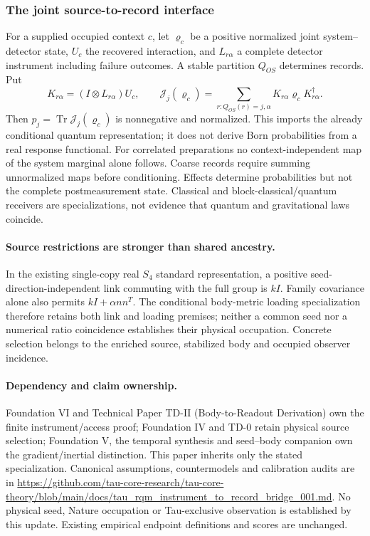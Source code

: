 \documentclass[11pt]{article}
\begin{document}
\subsubsection{The joint source-to-record interface}
For a supplied occupied context $c$, let $\varrho_c$ be a positive normalized
joint system--detector state, $U_c$ the recovered interaction, and
$L_{r\alpha}$ a complete detector instrument including failure outcomes.
A stable partition $Q_{OS}$ determines records. Put
\[
 K_{r\alpha}=(I\otimes L_{r\alpha})U_c,\qquad
 \mathcal J_j(\varrho_c)=
 \sum_{r:Q_{OS}(r)=j,\alpha}K_{r\alpha}\varrho_c K_{r\alpha}^\dagger.
\]
Then $p_j=\operatorname{Tr}\mathcal J_j(\varrho_c)$ is nonnegative and
normalized. This imports the already conditional quantum representation;
it does not derive Born probabilities from a real response functional.
For correlated preparations no context-independent map of the system
marginal alone follows. Coarse records require summing unnormalized maps
before conditioning. Effects determine probabilities but not the complete
postmeasurement state. Classical and block-classical/quantum receivers are
specializations, not evidence that quantum and gravitational laws coincide.

\paragraph{Source restrictions are stronger than shared ancestry.}
In the existing single-copy real $S_4$ standard representation, a positive
seed-direction-independent link commuting with the full group is $kI$.
Family covariance alone also permits $kI+\alpha nn^T$. The conditional
body-metric loading specialization therefore retains both link and loading
premises; neither a common seed nor a numerical ratio coincidence establishes
their physical occupation. Concrete selection belongs to the enriched source,
stabilized body and occupied observer incidence.

\paragraph{Dependency and claim ownership.}
Foundation VI and Technical Paper TD-II (Body-to-Readout Derivation) own the finite instrument/access proof; Foundation IV and TD-0 retain physical source selection; Foundation V, the temporal synthesis and seed--body companion own the gradient/inertial distinction. This paper inherits only the stated specialization. Canonical assumptions, countermodels and calibration audits are in \url{https://github.com/tau-core-research/tau-core-theory/blob/main/docs/tau_rqm_instrument_to_record_bridge_001.md}. No physical seed, Nature occupation or Tau-exclusive observation is established by this update. Existing empirical endpoint definitions and scores are unchanged.
\end{document}
